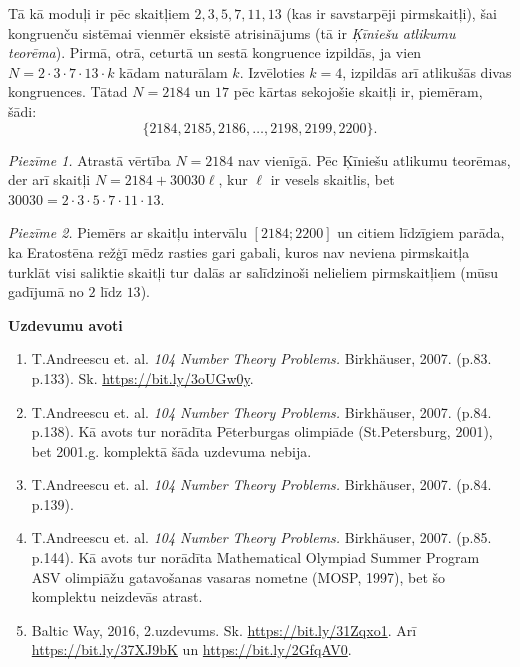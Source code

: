 \documentclass[a4paper,12pt]{article}
\begin{document}
Tā kā moduļi ir pēc skaitļiem $2, 3, 5, 7, 11, 13$ (kas ir savstarpēji pirmskaitļi), šai 
kongruenču sistēmai vienmēr eksistē atrisinājums (tā ir {\em Ķīniešu atlikumu teorēma}).
Pirmā, otrā, ceturtā un sestā kongruence izpildās, ja vien $N = 2 \cdot 3 \cdot 7 \cdot 13 \cdot k$ kādam
naturālam $k$. Izvēloties $k = 4$, izpildās arī atlikušās divas kongruences. Tātad
$N = 2184$ un $17$ pēc kārtas sekojošie skaitļi ir, piemēram, šādi:
\[ \{ 2184, 2185, 2186, \ldots, 2198, 2199, 2200 \}. \]

\vspace{5pt}
{\em Piezīme 1.} Atrastā vērtība $N=2184$ nav vienīgā. Pēc Ķīniešu atlikumu teorēmas, der arī 
skaitļi $N=2184 + 30030\ell$, kur $\ell$ ir vesels skaitlis, bet $30030 = 2 \cdot 3 \cdot 5 \cdot 7 \cdot 11 \cdot 13$. 

\vspace{5pt}
{\em Piezīme 2.} Piemērs ar skaitļu intervālu $[2184;2200]$ un citiem līdzīgiem parāda, ka Eratostēna 
režģī mēdz rasties gari gabali, kuros nav neviena pirmskaitļa \textendash{} turklāt visi saliktie skaitļi 
tur dalās ar salīdzinoši nelieliem pirmskaitļiem (mūsu gadījumā no $2$ līdz $13$). 

\newpage

{\bf Uzdevumu avoti}

\begin{enumerate}
\item T.Andreescu et. al. {\em 104 Number Theory Problems.} Birkhäuser, 2007. (p.83. p.133). 
Sk. \url{https://bit.ly/3oUGw0y}.
\item T.Andreescu et. al. {\em 104 Number Theory Problems.} Birkhäuser, 2007. (p.84. p.138). 
Kā avots tur norādīta Pēterburgas olimpiāde (St.Petersburg, 2001), bet 2001.g. komplektā šāda uzdevuma nebija.
\item T.Andreescu et. al. {\em 104 Number Theory Problems.} Birkhäuser, 2007. (p.84. p.139). 
\item T.Andreescu et. al. {\em 104 Number Theory Problems.} Birkhäuser, 2007. (p.85. p.144). 
Kā avots tur norādīta Mathematical Olympiad Summer Program \textendash{} ASV olimpiāžu gatavošanas 
vasaras nometne (MOSP, 1997), bet šo komplektu neizdevās atrast.
\item Baltic Way, 2016, 2.uzdevums. Sk. \url{https://bit.ly/31Zqxo1}. Arī \url{https://bit.ly/37XJ9bK} un 
\url{https://bit.ly/2GfqAV0}.
\end{enumerate}
\end{document}
